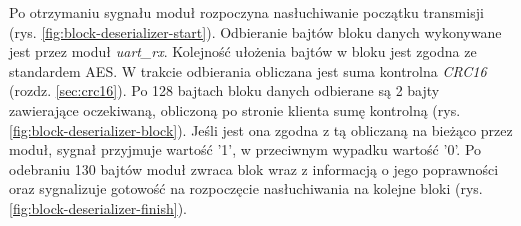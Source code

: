Po otrzymaniu sygnału  moduł rozpoczyna nasłuchiwanie początku transmisji (rys. \ref{fig:block-deserializer-start}). Odbieranie bajtów bloku danych wykonywane jest przez moduł \textit{uart\_rx}. Kolejność ułożenia bajtów w bloku  jest zgodna ze standardem AES. W trakcie odbierania obliczana jest suma kontrolna \textit{CRC16} (rozdz. \ref{sec:crc16}). Po 128 bajtach bloku danych odbierane są 2 bajty zawierające oczekiwaną, obliczoną po stronie klienta sumę kontrolną (rys. \ref{fig:block-deserializer-block}). Jeśli jest ona zgodna z tą obliczaną na bieżąco przez moduł, sygnał  przyjmuje wartość {'1'}, w przeciwnym wypadku wartość {'0'}. Po odebraniu 130 bajtów moduł zwraca blok  wraz z informacją o jego poprawności  oraz sygnalizuje gotowość na rozpoczęcie nasłuchiwania na kolejne bloki  (rys. \ref{fig:block-deserializer-finish}).

\begin{center}
\centering
{}
\label{fig:block-deserializer-start}
\end{center}

